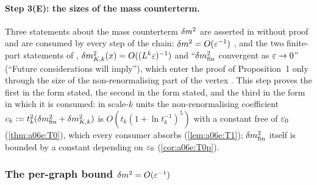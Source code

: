
\paragraph{Step 3(E): the sizes of the mass counterterm.} Three statements about the mass counterterm $\delta m^2$ are asserted in \cite{Ba2,Ba3} without proof and are consumed by every step of the chain: $\delta m^2=O(\varepsilon^{-1})$ \cite[p.~559]{Ba2}, and the two finite-part statements of \cite[p.~418]{Ba3}, $\delta m^2_{K,k}(x)=O((L^k\varepsilon)^{-1})$ and ``$\delta m^2_{\mathrm{fin}}$ convergent as $\varepsilon\to0$'' (``Future considerations will imply''), which enter the proof of Proposition~1 only through the size of the non-renormalising part of the \cite[(1.7)]{Ba3} vertex \cite[p.~421]{Ba3}. This step proves the first in the form stated, the second in the form stated, and the third in the form in which it is consumed: in scale-$k$ units the non-renormalising coefficient $c_k:= t_k^2(\delta m^2_{\mathrm{fin}}+\delta m^2_{K,k})$ is $O(t_k(1+\ln t_k^{-1})^5)$ with a constant free of $\varepsilon_0$ (\cref{thm:a06e:T0}), which every consumer absorbs (\cref{lem:a06e:T1}); $\delta m^2_{\mathrm{fin}}$ itself is bounded by a constant depending on $\varepsilon_0$ (\cref{cor:a06e:T0p}).

\subsubsection*{The per-graph bound $\delta m^2=O(\varepsilon^{-1})$}

